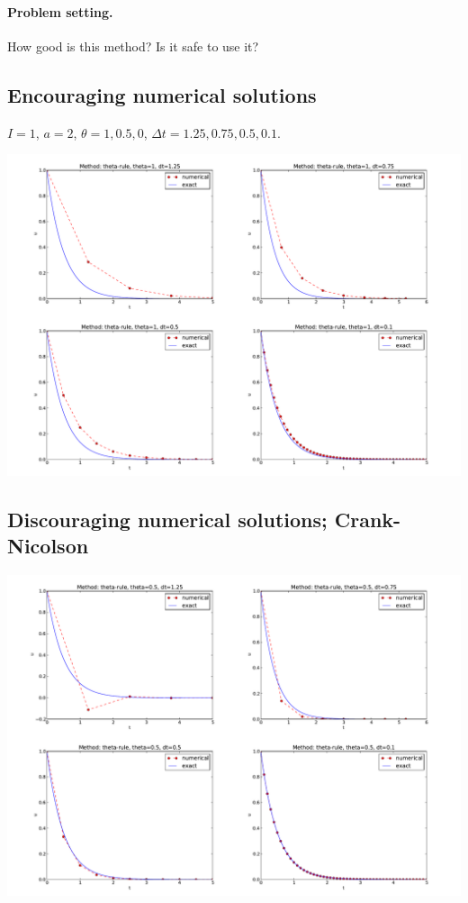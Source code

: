 \documentclass[%
oneside,                 %
final,                   %
10pt]{article}
\begin{document}
\paragraph{Problem setting.}
How good is this method? Is it safe to use it?



\subsection*{Encouraging numerical solutions}

$I=1$, $a=2$, $\theta =1,0.5, 0$, $\Delta t=1.25, 0.75, 0.5, 0.1$.



\centerline{\includegraphics[width=1.1\linewidth]{fig-analysis/BE4c.pdf}}



\subsection*{Discouraging numerical solutions; Crank-Nicolson}



\centerline{\includegraphics[width=1.1\linewidth]{fig-analysis/CN4c.pdf}}
\end{document}
